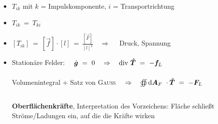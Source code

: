 \begin{enumerate}[label = \roman*]
\begin{itemize}
\item $T_{ik}$ mit $k$ = Impulskomponente, $i$ = Transportrichtung
\item $T_{ik} \ = \ T_{ki}$
\item $ [T_{ik}] \ = \ [\vec{f}] \cdot [l] \ = \ \frac{[\vec{F}]}{[l]^2} \quad \Rightarrow \quad$ Druck, Spannung
\item Stationäre Felder: $\quad \dot{\vec{g}} \ = \ 0 \quad \Rightarrow \quad \div \tens{T} \ = \ -\vec{f}_L$\\
\ \\
Volumenintegral + Satz von \textsc{Gauss} $ \quad \Rightarrow \quad \oiint\limits_{{}}^{{}}\mathrm{d}{\bm{A}_F}\  \cdot \bm{\hat{T}} \ = \ - \bm{F}_L \quad$\\
\ \\
\textbf{Oberflächenkräfte}, Interpretation des Vorzeichens: Fläche schließt Ströme/Ladungen ein, auf die die Kräfte wirken
\end{itemize}
\end{enumerate}